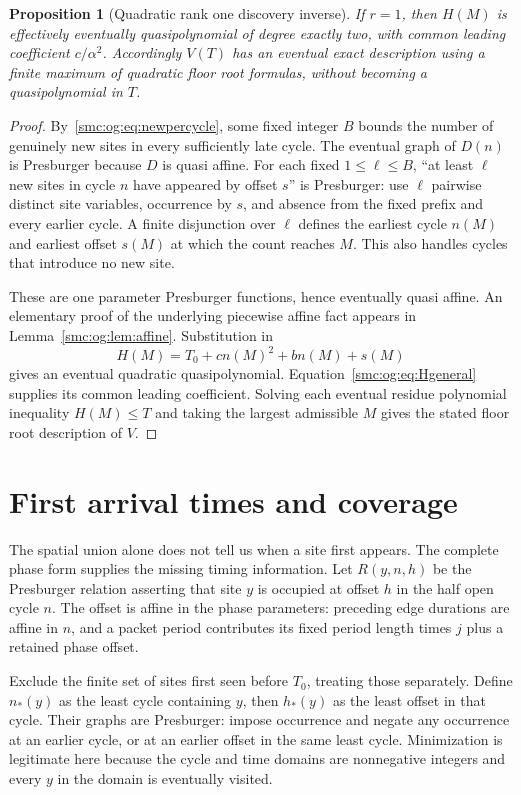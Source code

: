 \documentclass[11pt,letterpaper]{article}
\numberwithin{equation}{section}
\newtheorem{proposition}[theorem]{Proposition}
\theoremstyle{definition}
\theoremstyle{remark}
\begin{document}
\begin{proposition}[Quadratic rank one discovery inverse]\label{smc:og:prop:Hrank1}
If $r=1$, then $H(M)$ is effectively eventually quasipolynomial of degree exactly two, with common leading coefficient $c/\alpha^2$. Accordingly $V(T)$ has an eventual exact description using a finite maximum of quadratic floor root formulas, without becoming a quasipolynomial in $T$.
\end{proposition}
\begin{proof}
By~\eqref{smc:og:eq:newpercycle}, some fixed integer $B$ bounds the number of genuinely new sites in every sufficiently late cycle. The eventual graph of $D(n)$ is Presburger because $D$ is quasi affine. For each fixed $1\le\ell\le B$, ``at least $\ell$ new sites in cycle $n$ have appeared by offset $s$'' is Presburger: use $\ell$ pairwise distinct site variables, occurrence by $s$, and absence from the fixed prefix and every earlier cycle. A finite disjunction over $\ell$ defines the earliest cycle $n(M)$ and earliest offset $s(M)$ at which the count reaches $M$. This also handles cycles that introduce no new site.

These are one parameter Presburger functions, hence eventually quasi affine. An elementary proof of the underlying piecewise affine fact appears in Lemma~\ref{smc:og:lem:affine}. Substitution in
\[
 H(M)=T_0+cn(M)^2+bn(M)+s(M)
\]
gives an eventual quadratic quasipolynomial. Equation~\eqref{smc:og:eq:Hgeneral} supplies its common leading coefficient. Solving each eventual residue polynomial inequality $H(M)\le T$ and taking the largest admissible $M$ gives the stated floor root description of $V$.
\end{proof}

\section{First arrival times and coverage}\label{smc:og:sec:arrival}
The spatial union alone does not tell us when a site first appears. The complete phase form supplies the missing timing information. Let $R(y,n,h)$ be the Presburger relation asserting that site $y$ is occupied at offset $h$ in the half open cycle $n$. The offset is affine in the phase parameters: preceding edge durations are affine in $n$, and a packet period contributes its fixed period length times $j$ plus a retained phase offset.

Exclude the finite set of sites first seen before $T_0$, treating those separately. Define $n_*(y)$ as the least cycle containing $y$, then $h_*(y)$ as the least offset in that cycle. Their graphs are Presburger: impose occurrence and negate any occurrence at an earlier cycle, or at an earlier offset in the same least cycle. Minimization is legitimate here because the cycle and time domains are nonnegative integers and every $y$ in the domain is eventually visited.
\end{document}
